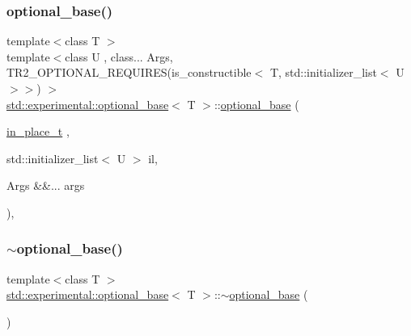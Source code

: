 \mbox{\label{structstd_1_1experimental_1_1optional__base_ae63b6e3b01c36339007f52f4069c1f4f}} 
\subsubsection{\texorpdfstring{optional\+\_\+base()}{optional\_base()}\hspace{0.1cm}{\footnotesize\ttfamily [5/5]}}
{\footnotesize\ttfamily template$<$class T $>$ \\
template$<$class U , class... Args, T\+R2\+\_\+\+O\+P\+T\+I\+O\+N\+A\+L\+\_\+\+R\+E\+Q\+U\+I\+R\+E\+S(is\+\_\+constructible$<$ T, std\+::initializer\+\_\+list$<$ U $>$$>$) $>$ \\
\mbox{\hyperlink{structstd_1_1experimental_1_1optional__base}{std\+::experimental\+::optional\+\_\+base}}$<$ T $>$\+::\mbox{\hyperlink{structstd_1_1experimental_1_1optional__base}{optional\+\_\+base}} (\begin{DoxyParamCaption}\item[{\mbox{\hyperlink{structstd_1_1experimental_1_1in__place__t}{in\+\_\+place\+\_\+t}}}]{,  }\item[{std\+::initializer\+\_\+list$<$ U $>$}]{il,  }\item[{Args \&\&...}]{args }\end{DoxyParamCaption})\hspace{0.3cm}{\ttfamily [inline]}, {\ttfamily [explicit]}}

\mbox{\label{structstd_1_1experimental_1_1optional__base_ad89678b8ebde087b1f3f61466a7436b9}} 
\subsubsection{\texorpdfstring{$\sim$optional\+\_\+base()}{~optional\_base()}}
{\footnotesize\ttfamily template$<$class T $>$ \\
\mbox{\hyperlink{structstd_1_1experimental_1_1optional__base}{std\+::experimental\+::optional\+\_\+base}}$<$ T $>$\+::$\sim$\mbox{\hyperlink{structstd_1_1experimental_1_1optional__base}{optional\+\_\+base}} (\begin{DoxyParamCaption}{ }\end{DoxyParamCaption})\hspace{0.3cm}{\ttfamily [inline]}}



